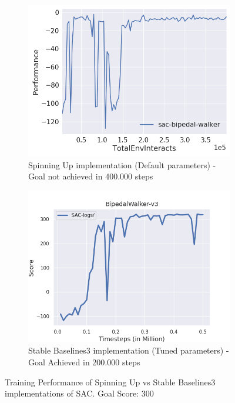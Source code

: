 \begin{figure}[h]
     \centering
     \begin{subfigure}[c]{0.49\textwidth}
         \centering
         \includegraphics[width=\textwidth]{figures/rl-framework/sac-bipedal-walker.png}
         \caption{Spinning Up implementation (Default parameters) - Goal not achieved in 400.000 steps}
     \end{subfigure}
     \hfill
     \begin{subfigure}[c]{0.49\textwidth}
         \centering
         \includegraphics[width=\textwidth]{figures/rl-framework/sb3-sac-BipedalWalker-v3.png}
         \caption{Stable Baselines3 implementation (Tuned parameters) - Goal Achieved in 200.000 steps}
     \end{subfigure}
        \caption{Training Performance of Spinning Up vs Stable Baselines3 implementations of SAC. Goal Score: 300}
        \label{fig:spinup-vs-sb3}
\end{figure}

